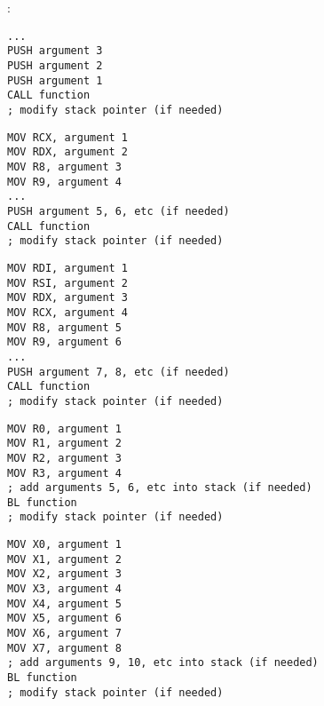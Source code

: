 \chapter{\PrintfSeveralArgumentsSectionName}






\ifdefined\IncludeARM


\fi

\section{\Conclusion{}}

:

\begin{lstlisting}[caption=x86]
...
PUSH argument 3
PUSH argument 2
PUSH argument 1
CALL function
; modify stack pointer (if needed)
\end{lstlisting}

\begin{lstlisting}[caption=x64 (MSVC)]
MOV RCX, argument 1
MOV RDX, argument 2
MOV R8, argument 3
MOV R9, argument 4
...
PUSH argument 5, 6, etc (if needed)
CALL function
; modify stack pointer (if needed)
\end{lstlisting}

\begin{lstlisting}[caption=x64 (GCC)]
MOV RDI, argument 1
MOV RSI, argument 2
MOV RDX, argument 3
MOV RCX, argument 4
MOV R8, argument 5
MOV R9, argument 6
...
PUSH argument 7, 8, etc (if needed)
CALL function
; modify stack pointer (if needed)
\end{lstlisting}

\begin{lstlisting}[caption=ARM]
MOV R0, argument 1
MOV R1, argument 2
MOV R2, argument 3
MOV R3, argument 4
; add arguments 5, 6, etc into stack (if needed)
BL function
; modify stack pointer (if needed)
\end{lstlisting}

\begin{lstlisting}[caption=ARM64]
MOV X0, argument 1
MOV X1, argument 2
MOV X2, argument 3
MOV X3, argument 4
MOV X4, argument 5
MOV X5, argument 6
MOV X6, argument 7
MOV X7, argument 8
; add arguments 9, 10, etc into stack (if needed)
BL function
; modify stack pointer (if needed)
\end{lstlisting}

